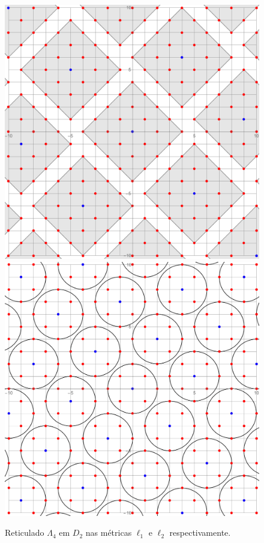 \documentclass{article}
\theoremstyle{plain}
\theoremstyle{definition}
\theoremstyle{remark}
\begin{document}
\begin{figure}[!ht]
  \centering
  \includegraphics[scale=0.24]{newcoder4l1.pdf}\;\;\;\;\includegraphics[scale=0.2]{newcoder2l2.pdf}
  \caption{Reticulado $\Lambda_4$ em $D_2$ nas métricas $\ell_1$ e $\ell_2$ respectivamente.}
\end{figure}
\end{document}
